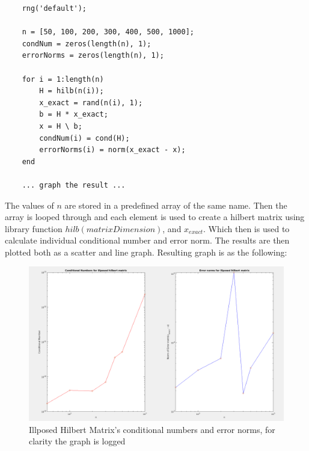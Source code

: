 \documentclass[unicode,11pt,a4paper,oneside,numbers=endperiod,openany]{scrartcl}
\begin{document}
\begin{enumerate}[label=(\alph*)]
\newpage

\begin{lstlisting}
    rng('default');

    n = [50, 100, 200, 300, 400, 500, 1000];
    condNum = zeros(length(n), 1);
    errorNorms = zeros(length(n), 1);

    for i = 1:length(n)
        H = hilb(n(i));
        x_exact = rand(n(i), 1);
        b = H * x_exact;
        x = H \ b;
        condNum(i) = cond(H);
        errorNorms(i) = norm(x_exact - x);
    end
    
    ... graph the result ...
\end{lstlisting}

\vspace{20px}

The values of ${n}$ are stored in a predefined array of the same name. Then the array is looped through and each element is used to create a hilbert matrix using library function ${hilb(matrixDimension)}$, and ${x_{exact}}$. Which then is used to calculate individual conditional number and error norm. The results are then plotted both as a scatter and line graph. Resulting graph is as the following: \\

\vspace{20px}

 \begin{figure}[h!]
    \begin{minipage}[c]{1\linewidth}
        \centering
        \includegraphics[width=0.9\linewidth]{./figures/ex5b.png}
    \end{minipage}
  \caption{Illposed Hilbert Matrix's conditional numbers and error norms, for clarity the graph is logged}
\end{figure}

\newpage


\end{enumerate}
\end{document}
